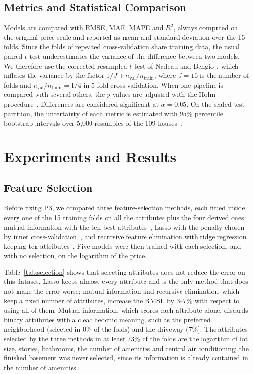 \documentclass[conference]{IEEEtran}
\begin{document}
\subsection{Metrics and Statistical Comparison}

Models are compared with RMSE, MAE, MAPE and $R^2$, always computed on the original price scale and reported as mean and standard deviation over the 15 folds. Since the folds of repeated cross-validation share training data, the usual paired $t$-test underestimates the variance of the difference between two models. We therefore use the corrected resampled $t$-test of Nadeau and Bengio~\cite{nadeau2003}, which inflates the variance by the factor $1/J + n_{\text{val}}/n_{\text{train}}$, where $J = 15$ is the number of folds and $n_{\text{val}}/n_{\text{train}} = 1/4$ in 5-fold cross-validation. When one pipeline is compared with several others, the $p$-values are adjusted with the Holm procedure~\cite{holm1979}. Differences are considered significant at $\alpha = 0.05$. On the sealed test partition, the uncertainty of each metric is estimated with 95\% percentile bootstrap intervals over 5{,}000 resamples of the 109 houses~\cite{efron1993}.

\section{Experiments and Results}
\label{sec:results}

\subsection{Feature Selection}
\label{sec:selection}

Before fixing P3, we compared three feature-selection methods, each fitted inside every one of the 15 training folds on all the attributes plus the four derived ones: mutual information with the ten best attributes~\cite{kraskov2004}, Lasso with the penalty chosen by inner cross-validation~\cite{tibshirani1996}, and recursive feature elimination with ridge regression keeping ten attributes~\cite{guyon2002}. Five models were then trained with each selection, and with no selection, on the logarithm of the price.

Table~\ref{tab:selection} shows that selecting attributes does not reduce the error on this dataset. Lasso keeps almost every attribute and is the only method that does not make the error worse; mutual information and recursive elimination, which keep a fixed number of attributes, increase the RMSE by 3--7\% with respect to using all of them. Mutual information, which scores each attribute alone, discards binary attributes with a clear hedonic meaning, such as the preferred neighborhood (selected in 0\% of the folds) and the driveway (7\%). The attributes selected by the three methods in at least 73\% of the folds are the logarithm of lot size, stories, bathrooms, the number of amenities and central air conditioning; the finished basement was never selected, since its information is already contained in the number of amenities.
\end{document}
